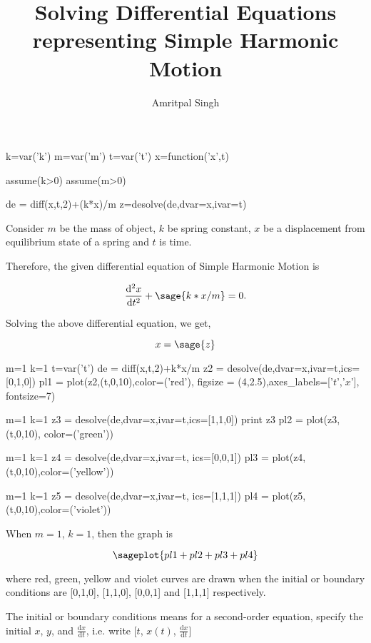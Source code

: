 \documentclass{article}
\title{Solving Differential Equations representing Simple Harmonic Motion}
\author{Amritpal Singh}
\begin{document}
\maketitle

\begin{sagesilent}
k=var('k')
m=var('m')
t=var('t')
x=function('x',t)

assume(k>0)
assume(m>0)

de = diff(x,t,2)+(k*x)/m
z=desolve(de,dvar=x,ivar=t)
\end{sagesilent}
Consider $m$ be the mass of object, $k$ be spring constant, $x$ be a displacement from equilibrium state of a spring and $t$ is time. 

Therefore, the given differential equation of Simple Harmonic Motion is  

\[
  \frac{\mathrm{d}^{2}x}{\mathrm{d}t^{2}} +  \sage{k*x/m} = 0.
\]

Solving the above differential equation, we get,

$$x = \sage{z}$$

\begin{sagesilent}
m=1
k=1
t=var('t')
de = diff(x,t,2)+k*x/m
z2 = desolve(de,dvar=x,ivar=t,ics=[0,1,0])
pl1 = plot(z2,(t,0,10),color=('red'), figsize = (4,2.5),axes_labels=['$t$','$x$'], fontsize=7)

m=1
k=1
z3 = desolve(de,dvar=x,ivar=t,ics=[1,1,0])
print z3
pl2 = plot(z3,(t,0,10), color=('green'))

m=1
k=1
z4 = desolve(de,dvar=x,ivar=t, ics=[0,0,1])
pl3 = plot(z4,(t,0,10),color=('yellow'))

m=1
k=1
z5 = desolve(de,dvar=x,ivar=t, ics=[1,1,1])
pl4 = plot(z5,(t,0,10),color=('violet'))
\end{sagesilent}

When $m=1$, $k=1$, then the graph is

$$\sageplot{pl1+pl2+pl3+pl4}$$

where red, green, yellow and violet curves are drawn when the initial or boundary conditions are [0,1,0], [1,1,0], [0,0,1] and [1,1,1] respectively.



The initial or boundary conditions means for a second-order equation, specify the initial $x$, $y$, and $\frac{\mathrm{d}x}{\mathrm{d}t}$, i.e. write [$t$, $x(t)$, $\frac{\mathrm{d}x}{\mathrm{d}t}$]
\end{document}
